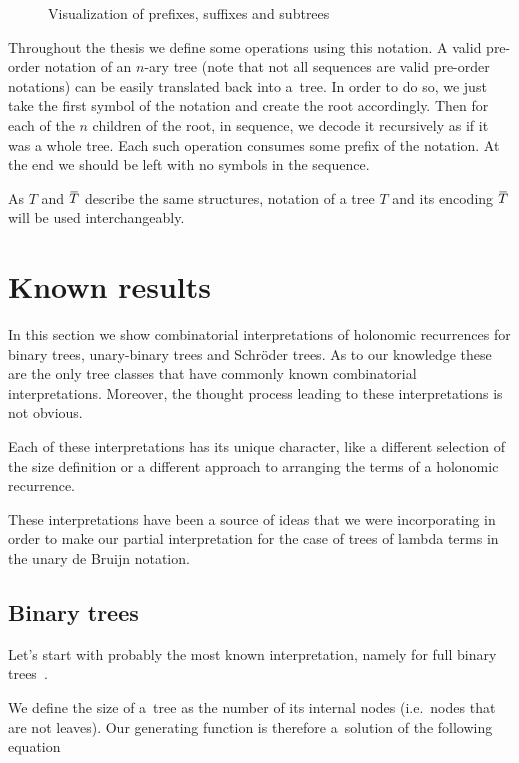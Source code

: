 \documentclass[final]{article}
\theoremstyle{definition}
\theoremstyle{definition}
\theoremstyle{remark}
\newcommand{\ols}[1]{\mskip.5\thinmuskip\overline{\mskip-.5\thinmuskip {#1} \mskip-.5\thinmuskip}\mskip.5\thinmuskip} %
\newcommand{\enc}[1]{\ensuremath{\ols{#1}}}
\begin{document}
\begin{figure}[H]
    \centering
    
    \caption{Visualization of prefixes, suffixes and subtrees}%
    \label{fig:presuf}
\end{figure}

Throughout the thesis we define some operations using this notation. A valid pre-order notation of an \(n\)-ary tree (note that not all sequences are valid pre-order notations) can be easily translated back into a~tree. In order to do so, we just take the first symbol of the notation and create the root accordingly. Then for each of the \(n\) children of the root, in sequence, we decode it recursively as if it was a whole tree. Each such operation consumes some prefix of the notation. At the end we should be left with no symbols in the sequence.

As \(T\) and \(\enc{T}\) describe the same structures, notation of a tree \(T\) and its encoding \(\enc{T}\) will be used interchangeably.

\section{Known results}%
\label{sec:known_results}

In this section we show combinatorial interpretations of holonomic recurrences for binary trees, unary-binary trees and Schröder trees. As to our knowledge these are the only tree classes that have commonly known combinatorial interpretations. Moreover, the thought process leading to these interpretations is not obvious.

Each of these interpretations has its unique character, like a different selection of the size definition or a different approach to arranging the terms of a holonomic recurrence.

These interpretations have been a source of ideas that we were incorporating in order to make our partial interpretation for the case of trees of lambda terms in the unary de Bruijn notation.

\subsection{Binary trees}%
\label{sub:binary_trees}

Let's start with probably the most known interpretation, namely for full binary trees~\cite{binary}.

We define the size of a~tree as the number of its internal nodes (i.e.~nodes that are not leaves). Our generating function is therefore a~solution of the following equation
\end{document}
